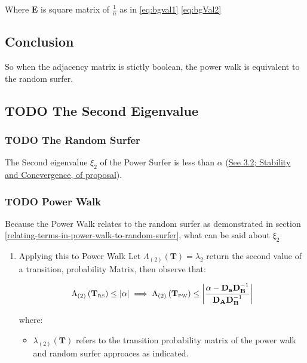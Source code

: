 \documentclass[11pt]{article}
\begin{document}
Where \(\mathbf{E}\) is square matrix of \(\frac{1}{n}\) as in \eqref{eq:bgval1}  \eqref{eq:bgVal2}

\subsection{Conclusion}
\label{sec:org49c7c03}
So when the adjacency matrix is stictly boolean, the power walk is equivalent to the random surfer.

\subsection{{\bfseries\sffamily TODO} The Second Eigenvalue}
\label{sec:org4706955}
\subsubsection{{\bfseries\sffamily TODO} The Random Surfer}
\label{sec:org60cbd73}
The Second eigenvalue \(\xi_2\) of the Power Surfer is less than \(\alpha\) (\href{Proposal/Propsal.org}{See 3.2; Stability and Concvergence, of proposal}).
\subsubsection{{\bfseries\sffamily TODO} Power Walk}
\label{sec:orge6cdad0}
Because the Power Walk relates to the random surfer as demonstrated in section \ref{relating-terms-in-power-walk-to-random-surfer}, what can be said about \(\xi_{2}\)
\begin{enumerate}
\item Applying this to Power Walk
\label{sec:org18bf76f}
Let \(\Lambda_{\left( 2 \right)}\left( \mathbf{T} \right) = \lambda_2\) return the second value of a transition, probability Matrix, then observe that:


\begin{align}
    \Lambda_{\left( 2 \right)} \left( \mathbf{T}_{\text{\tiny RS}} \right)  \leq \left\lvert \alpha \right\rvert  \implies      \Lambda_{\left( 2 \right)} \left( \mathbf{T}_{\text{\tiny PW}} \right) \leq \left\lvert \frac{\alpha - \mathbf{D}_{\mathbf{a}} \mathbf{D}_{\mathbf{B}}^{- 1}}{\mathbf{D}_{\mathbf{A}}\mathbf{D}_{\mathbf{B}}^{-1}}  \right\rvert
\end{align}

where:

\begin{itemize}
\item \(\lambda_{\left( 2 \right)} \left( \mathbf{T} \right)\) refers to the transition probability matrix of the power walk and random surfer approaces as indicated.
\end{itemize}
\end{enumerate}
\end{document}
